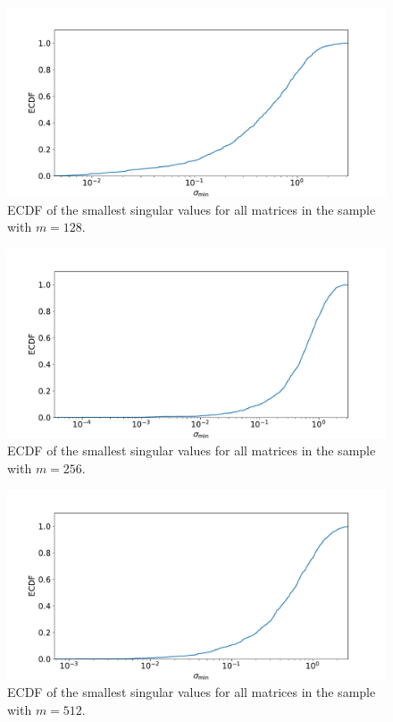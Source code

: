 \documentclass[a4paper, 11pt]{article}
\begin{document}
\begin{figure}
  \centering
  \includegraphics[width=\textwidth]{../2/square_ecdf/128.pdf}
  \caption{ECDF of the smallest singular values for all matrices in the sample with $m=128$.}
  \label{fig:sigma_min_ECDF_128}
\end{figure}
\begin{figure}
  \centering
  \includegraphics[width=\textwidth]{../2/square_ecdf/256.pdf}
  \caption{ECDF of the smallest singular values for all matrices in the sample with $m=256$.}
  \label{fig:sigma_min_ECDF_256}
\end{figure}
\begin{figure}
  \centering
  \includegraphics[width=\textwidth]{../2/square_ecdf/512.pdf}
  \caption{ECDF of the smallest singular values for all matrices in the sample with $m=512$.}
  \label{fig:sigma_min_ECDF_512}
\end{figure}
\end{document}
